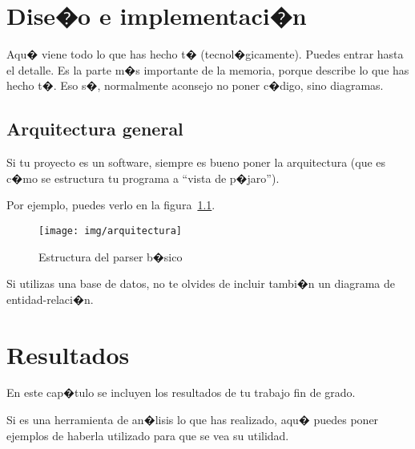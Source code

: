 \documentclass[a4paper, 12pt]{book}
\begin{document}
\chapter{Dise�o e implementaci�n}

Aqu� viene todo lo que has hecho t� (tecnol�gicamente).
Puedes entrar hasta el detalle.
Es la parte m�s importante de la memoria, porque describe lo que has hecho t�.
Eso s�, normalmente aconsejo no poner c�digo, sino diagramas.

\section{Arquitectura general}
\label{sec:arquitectura}

Si tu proyecto es un software, siempre es bueno poner la arquitectura (que es c�mo se estructura tu programa a ``vista de p�jaro'').

Por ejemplo, puedes verlo en la figura~\ref{fig:arquitectura}.

\begin{figure}
  \centering
  \texttt{[image: img/arquitectura]}
  \caption{Estructura del parser b�sico}
  \label{fig:arquitectura}
\end{figure}

Si utilizas una base de datos, no te olvides de incluir tambi�n un diagrama de entidad-relaci�n.



\cleardoublepage
\chapter{Resultados}

En este cap�tulo se incluyen los resultados de tu trabajo fin de grado.

Si es una herramienta de an�lisis lo que has realizado, aqu� puedes poner ejemplos de haberla utilizado para que se vea su utilidad.


\end{document}
